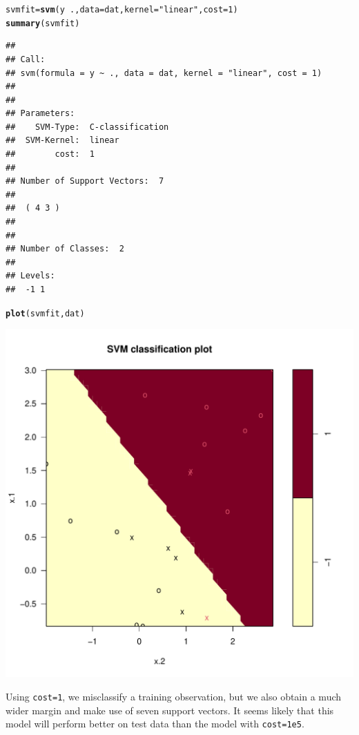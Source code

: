 \documentclass[12pt]{article}\usepackage[]{graphicx}\usepackage[]{color}
\makeatletter
\def\maxwidth{ %
  \ifdim\Gin@nat@width>\linewidth
    \linewidth
  \else
    \Gin@nat@width
  \fi
}
\newcommand{\hlnum}[1]{\textcolor[rgb]{0.686,0.059,0.569}{#1}}%
\newcommand{\hlstr}[1]{\textcolor[rgb]{0.192,0.494,0.8}{#1}}%
\newcommand{\hlopt}[1]{\textcolor[rgb]{0,0,0}{#1}}%
\newcommand{\hlstd}[1]{\textcolor[rgb]{0.345,0.345,0.345}{#1}}%
\newcommand{\hlkwb}[1]{\textcolor[rgb]{0.69,0.353,0.396}{#1}}%
\newcommand{\hlkwc}[1]{\textcolor[rgb]{0.333,0.667,0.333}{#1}}%
\newcommand{\hlkwd}[1]{\textcolor[rgb]{0.737,0.353,0.396}{\textbf{#1}}}%
\newenvironment{kframe}{%
 \def\at@end@of@kframe{}%
 \ifinner\ifhmode%
  \def\at@end@of@kframe{\end{minipage}}%
  \begin{minipage}{\columnwidth}%
 \fi\fi%
 \def\FrameCommand##1{\hskip\@totalleftmargin \hskip-\fboxsep
 \colorbox{shadecolor}{##1}\hskip-\fboxsep
     \hskip-\linewidth \hskip-\@totalleftmargin \hskip\columnwidth}%
 \MakeFramed {\advance\hsize-\width
   \@totalleftmargin\z@ \linewidth\hsize
   \@setminipage}}%
 {\par\unskip\endMakeFramed%
 \at@end@of@kframe}
\newenvironment{knitrout}{}{} %
\makeatother
\begin{document}
\begin{knitrout}
\color{fgcolor}\begin{kframe}
\begin{alltt}
\hlstd{svmfit}\hlkwb{=}\hlkwd{svm}\hlstd{(y}\hlopt{~}\hlstd{.,} \hlkwc{data}\hlstd{=dat,} \hlkwc{kernel}\hlstd{=}\hlstr{"linear"}\hlstd{,} \hlkwc{cost}\hlstd{=}\hlnum{1}\hlstd{)}
\hlkwd{summary}\hlstd{(svmfit)}
\end{alltt}
\begin{verbatim}
## 
## Call:
## svm(formula = y ~ ., data = dat, kernel = "linear", cost = 1)
## 
## 
## Parameters:
##    SVM-Type:  C-classification 
##  SVM-Kernel:  linear 
##        cost:  1 
## 
## Number of Support Vectors:  7
## 
##  ( 4 3 )
## 
## 
## Number of Classes:  2 
## 
## Levels: 
##  -1 1
\end{verbatim}
\begin{alltt}
\hlkwd{plot}\hlstd{(svmfit,dat)}
\end{alltt}
\end{kframe}
\includegraphics[width=\maxwidth]{figure/unnamed-chunk-16-1} 

\end{knitrout}

Using \texttt{cost=1}, we misclassify a training observation, but we also obtain a much wider margin and make use of seven support vectors. It seems likely that this model will perform better on test data than the model with \texttt{cost=1e5}.
\end{document}
